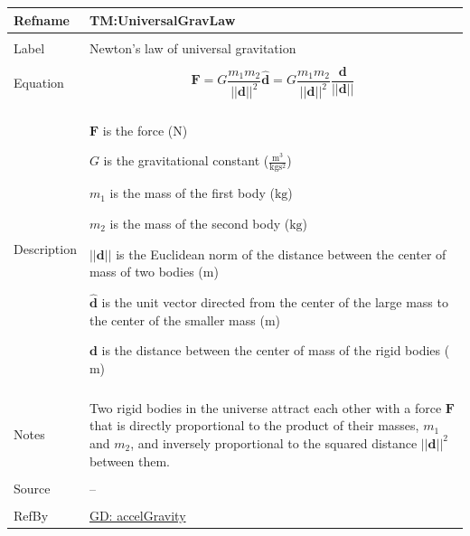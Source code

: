 \documentclass[12pt]{article}
\begin{document}
\begin{minipage}{\textwidth}
\begin{tabular}{>{\raggedright}p{}>{\raggedright\arraybackslash}p{}}
\toprule \textbf{Refname} & \textbf{TM:UniversalGravLaw}
\label{TM:UniversalGravLaw}
\\ \midrule \\
Label & Newton's law of universal gravitation
        
\\ \midrule \\
Equation & \begin{displaymath}
           \mathbf{F}=G \frac{{m_{1}} {m_{2}}}{\text{||}\mathbf{d}\text{||}^{2}} \mathbf{\hat{d}}=G \frac{{m_{1}} {m_{2}}}{\text{||}\mathbf{d}\text{||}^{2}} \frac{\mathbf{d}}{\text{||}\mathbf{d}\text{||}}
           \end{displaymath}
\\ \midrule \\
Description & \begin{symbDescription}
              \item{$\mathbf{F}$ is the force (${\text{N}}$)}
              \item{$G$ is the gravitational constant ($\frac{\text{m}^{3}}{\text{kg}\text{s}^{2}}$)}
              \item{${m_{1}}$ is the mass of the first body (${\text{kg}}$)}
              \item{${m_{2}}$ is the mass of the second body (${\text{kg}}$)}
              \item{$\text{||}\mathbf{d}\text{||}$ is the Euclidean norm of the distance between the center of mass of two bodies (${\text{m}}$)}
              \item{$\mathbf{\hat{d}}$ is the unit vector directed from the center of the large mass to the center of the smaller mass (${\text{m}}$)}
              \item{$\mathbf{d}$ is the distance between the center of mass of the rigid bodies (${\text{m}}$)}
              \end{symbDescription}
\\ \midrule \\
Notes & Two rigid bodies in the universe attract each other with a force $\mathbf{F}$ that is directly proportional to the product of their masses, ${m_{1}}$ and ${m_{2}}$, and inversely proportional to the squared distance ${\text{||}\mathbf{d}\text{||}^{2}}$ between them.
        
\\ \midrule \\
Source & --
         
\\ \midrule \\
RefBy & \hyperref[GD:accelGravity]{GD: accelGravity}
        
\\ \bottomrule
\end{tabular}
\end{minipage}
\end{document}
